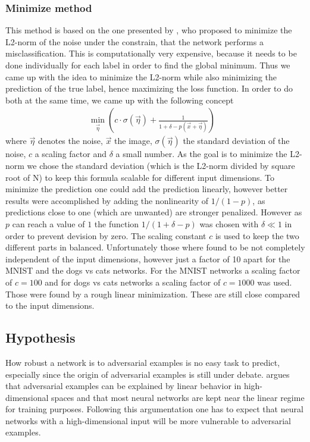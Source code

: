 \documentclass[%
 reprint,
 amsmath,amssymb,
 aps,
]{revtex4-1}
\begin{document}
\subsubsection*{Minimize method}
This method is based on the one presented by \citeauthor{paperMinimize}, who proposed to minimize the L2-norm of the noise under the constrain, that the network performs a misclassification. This is computationally very expensive, because it needs to be done individually for each label in order to find the global minimum. Thus we came up with the idea to minimize the L2-norm while also minimizing the prediction of the true label, hence maximizing the loss function. In order to do both at the same time, we came up with the following concept
\begin{align}
\min_{\vec{\eta}} \left( c \cdot \sigma(\vec{\eta}) + \frac{1}{1 + \delta - p(\vec{x}+\vec{\eta})} \right) & \label{eq:minimize}
\end{align}
where $\vec{\eta}$ denotes the noise, $\vec{x}$ the image, $\sigma (\vec{\eta})$ the standard deviation of the noise, $c$ a scaling factor and $\delta$ a small number. As the goal is to minimize the L2-norm we chose the standard deviation (which is the L2-norm divided by square root of N) to keep this formula scalable for different input dimensions. To minimize the prediction one could add the prediction linearly, however better results were accomplished by adding the nonlinearity of $1/(1-p)$, as predictions close to one (which are unwanted) are stronger penalized. However as $p$ can reach a value of $1$ the function $1/(1 + \delta - p)$ was chosen with $\delta \ll 1$ in order to prevent devision by zero. The scaling constant $c$ is used to keep the two different parts in balanced. Unfortunately those where found to be not completely independent of the input dimensions, however just a factor of 10 apart for the MNIST and the dogs vs cats networks. For the MNIST networks a scaling factor of $c = 100$ and for dogs vs cats networks a scaling factor of $c = 1000$ was used. Those were found by a rough linear minimization. These are still close compared to the input dimensions.

\subsection{Hypothesis}
\label{sec:hypothesis}

How robust a network is to adversarial examples is no easy task to predict, especially since the origin of adversarial examples is still under debate. \citeauthor{paperGrad} argues that adversarial examples can be explained by linear behavior in high-dimensional spaces and that most neural networks are kept near the linear regime for training purposes. Following this argumentation one has to expect that neural networks with a high-dimensional input will be more vulnerable to adversarial examples.
\end{document}
